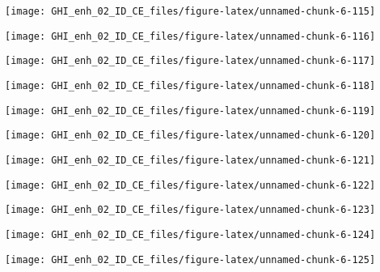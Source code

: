 \documentclass[
  10pt,
  a4paper,oneside]{article}
\begin{document}
\begin{center}\texttt{[image: GHI\_enh\_02\_ID\_CE\_files/figure-latex/unnamed-chunk-6-115]} \end{center}

\begin{center}\texttt{[image: GHI\_enh\_02\_ID\_CE\_files/figure-latex/unnamed-chunk-6-116]} \end{center}

\begin{center}\texttt{[image: GHI\_enh\_02\_ID\_CE\_files/figure-latex/unnamed-chunk-6-117]} \end{center}

\begin{center}\texttt{[image: GHI\_enh\_02\_ID\_CE\_files/figure-latex/unnamed-chunk-6-118]} \end{center}

\begin{center}\texttt{[image: GHI\_enh\_02\_ID\_CE\_files/figure-latex/unnamed-chunk-6-119]} \end{center}

\begin{center}\texttt{[image: GHI\_enh\_02\_ID\_CE\_files/figure-latex/unnamed-chunk-6-120]} \end{center}

\begin{center}\texttt{[image: GHI\_enh\_02\_ID\_CE\_files/figure-latex/unnamed-chunk-6-121]} \end{center}

\begin{center}\texttt{[image: GHI\_enh\_02\_ID\_CE\_files/figure-latex/unnamed-chunk-6-122]} \end{center}

\begin{center}\texttt{[image: GHI\_enh\_02\_ID\_CE\_files/figure-latex/unnamed-chunk-6-123]} \end{center}

\begin{center}\texttt{[image: GHI\_enh\_02\_ID\_CE\_files/figure-latex/unnamed-chunk-6-124]} \end{center}

\begin{center}\texttt{[image: GHI\_enh\_02\_ID\_CE\_files/figure-latex/unnamed-chunk-6-125]} \end{center}
\end{document}
